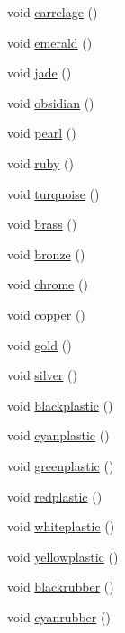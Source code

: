 \begin{DoxyCompactItemize}
\item 
void \hyperlink{classMateriel_a66ca8d88c1512b56bf7b70ad22c34a66}{carrelage} ()
\item 
void \hyperlink{classMateriel_a6263dc9dce75300abbb35e735f765fe4}{emerald} ()
\item 
void \hyperlink{classMateriel_a77273ccb5baec1f6275f6c2f7b175046}{jade} ()
\item 
void \hyperlink{classMateriel_a85c785d70801ecc361b01057bba419f1}{obsidian} ()
\item 
void \hyperlink{classMateriel_abed4f19c5cfd912c9ac82e2b5a38e530}{pearl} ()
\item 
void \hyperlink{classMateriel_a52fb9aafbdc20f7e29ee1727e0a222fc}{ruby} ()
\item 
void \hyperlink{classMateriel_ae4e624b1b697a2b5badf44c49b0f7120}{turquoise} ()
\item 
void \hyperlink{classMateriel_a56f7b01a878aafdd7f0a000ce5766b64}{brass} ()
\item 
void \hyperlink{classMateriel_a366139f1dcc6eab79878c0db8a44da5a}{bronze} ()
\item 
void \hyperlink{classMateriel_a8c854cb036967c7834b9acbc0d349a0c}{chrome} ()
\item 
void \hyperlink{classMateriel_a8d5cc28a0a2dc40523efc8d939e13c8f}{copper} ()
\item 
void \hyperlink{classMateriel_ab314429173c74e86d0b29f55aa51ef6e}{gold} ()
\item 
void \hyperlink{classMateriel_a1d93d7785ff2819aeb199066271e0250}{silver} ()
\item 
void \hyperlink{classMateriel_a770d2cc0691ecea22b7c337821683a80}{blackplastic} ()
\item 
void \hyperlink{classMateriel_a5467964d2a54dac87623822625b2bbf0}{cyanplastic} ()
\item 
void \hyperlink{classMateriel_ad6d5df0bea8baa02f9dd40b55e17a3ce}{greenplastic} ()
\item 
void \hyperlink{classMateriel_ac6bf319b8e840dd9c3c10daf4c0ba079}{redplastic} ()
\item 
void \hyperlink{classMateriel_a92cc89e6c6048b4b7e0bc646006fd91c}{whiteplastic} ()
\item 
void \hyperlink{classMateriel_ac517aab56c14afaeb8475e08f86a7dad}{yellowplastic} ()
\item 
void \hyperlink{classMateriel_aa639a9a59b81aa81c3fa10e249260c4c}{blackrubber} ()
\item 
void \hyperlink{classMateriel_aea8f32c293e90d570ce440c8ecdd4745}{cyanrubber} ()

\end{DoxyCompactItemize}
